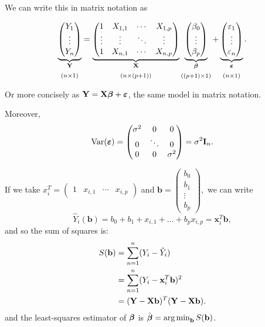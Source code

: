 \begin{notation}
	
We can write this in matrix notation as

\begin{align*}
		\underbrace{\begin{pmatrix}Y_1 \\ \vdots \\Y_n \end{pmatrix}}_{\substack{\YY \\ \\ (n\times 1)}}=\underbrace{\begin{pmatrix} 1&X_{1,1}&\cdots & X_{1,p} \\ \vdots & \vdots & \ddots &\vdots \\ 1 & X_{n,1} & \cdots & X_{n,p} \end{pmatrix}}_{\substack{\XX \\ \\ (n\times (p+1))}} \underbrace{\begin{pmatrix} \beta_0 \\ \vdots \\ \beta_p \end{pmatrix}}_{\substack{\boldsymbol \beta \\ \\ ((p+1)\times 1)}} + \underbrace{\begin{pmatrix} \epsilon_1 \\ \vdots \\ \epsilon_n \end{pmatrix}}_{\substack{\phantom X \boldsymbol \epsilon \phantom X\\ \\ (n\times 1)}}
.\end{align*}

Or more concisely as $\mathbf Y=\mathbf X {\boldsymbol{\beta}}+{\boldsymbol{\varepsilon}}$, the same model in matrix notation.
\end{notation}
Moreover,
\[
	\operatorname*{Var}({\boldsymbol{\varepsilon}})=\begin{pmatrix} \sigma^2 &0 &0 \\ 0 & \ddots & 0 \\ 0 & 0 & \sigma^2 \end{pmatrix}=\sigma^2\mathbf I_n.
\] 

	If we take $x_i^T=\begin{pmatrix} 1 & x_{i,1} & \cdots & x_{i,p} \end{pmatrix} $ and $\mathbf b=\begin{pmatrix} b_0 \\ b_1 \\ \vdots \\ b_p \end{pmatrix}, $ 
	we can write
	$$\hat{Y}_i(\mathbf b)=b_0+b_1+x_{i,1}+\ldots+b_p x_{i,p}=\mathbf x_i^T\mathbf b,$$
	and so the sum of squares is:
\begin{align*}
	S(\mathbf b)&=\sum_{n=1}^{n} (Y_i-\hat{Y}_i)\\
		    &=\sum_{n=1}^{n} (Y_i-\mathbf x_i^T\mathbf b)^2 \\
		    &=(\mathbf Y-\mathbf X\mathbf b)^T(\mathbf Y-\mathbf X\mathbf b)
.\end{align*}
and the least-squares estimator of ${\boldsymbol{\beta}}$ is $\hat{{\boldsymbol{\beta}}}=\operatorname*{arg\,min}_{\mathbf b}S(\mathbf b)$. 

